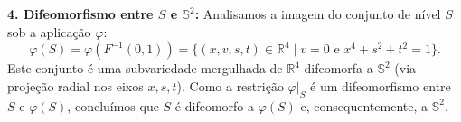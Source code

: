 {	\textbf{4. Difeomorfismo entre $S$ e $\mathbb{S}^2$:}
	Analisamos a imagem do conjunto de nível $S$ sob a aplicação $\varphi$:
	\begin{equation*}
		\varphi(S) = \varphi(F^{-1}(0,1)) = \{ (x, v, s, t) \in \mathbb{R}^4 \mid v=0 \text{ e } x^4+s^2+t^2=1 \}.
	\end{equation*}
	Este conjunto é uma subvariedade mergulhada de $\mathbb{R}^4$ difeomorfa a $\mathbb{S}^2$ (via projeção radial nos eixos $x,s,t$). Como a restrição $\varphi|_S$ é um difeomorfismo entre $S$ e $\varphi(S)$, concluímos que $S$ é difeomorfo a $\varphi(S)$ e, consequentemente, a $\mathbb{S}^2$.
}



